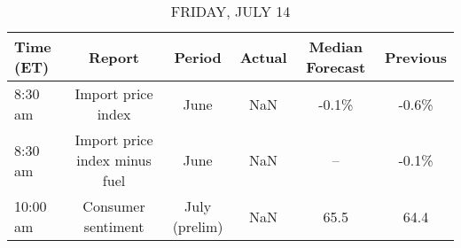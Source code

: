 \documentclass{article}%
\begin{document}
%


\begin{table}[htbp]%
\caption{FRIDAY, JULY 14}%
\centering%
\begin{adjustbox}{width=1\textwidth}%
\begin{tabular}{lccccc}
\toprule
Time (ET) &                        Report &        Period & Actual & Median Forecast & Previous \\
\midrule
  8:30 am &            Import price index &          June &    NaN &           -0.1\% &    -0.6\% \\
  8:30 am & Import price index minus fuel &          June &    NaN &              -- &    -0.1\% \\
 10:00 am &            Consumer sentiment & July (prelim) &    NaN &            65.5 &     64.4 \\
\bottomrule
\end{tabular}
%
\end{adjustbox}%
\end{table}
\end{document}
